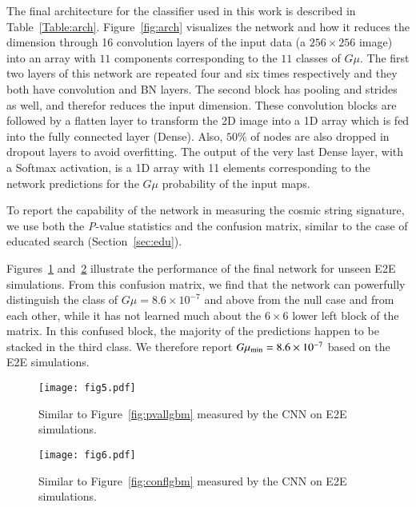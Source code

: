 \documentclass[fleqn,usenatbib]{mnras}
\newcommand{\bt}[1]{{\textcolor{Plum}{#1}}}
\begin{document}
%
The final architecture for the classifier used in this work is described in Table~\ref{Table:arch}. 
Figure~\ref{fig:arch} visualizes the network and how it reduces the dimension through 16 convolution layers of the input data (a $256\times 256$ image) into an array with $11$ components corresponding to the $11$ classes of $G\mu$.
The first two layers of this network are repeated four and six times respectively and they both have convolution and BN layers. The second block has  pooling and strides as well, and therefor reduces the input dimension. These convolution blocks are followed by a flatten layer to transform the 2D image into a 1D array which is fed into the fully connected layer (Dense). Also, $50\%$ of nodes are also dropped in dropout layers to avoid overfitting. The output of the very last Dense layer, with a Softmax activation, is a 1D array with 11 elements corresponding to the network predictions for the $G\mu$ probability of the input maps.


To report the capability of the network in measuring the cosmic string signature, we use both the {\it P}-value statistics and the confusion matrix, similar to the case of educated search (Section~\ref{sec:edu}).
\iffalse 
\bt{-- Note: Not sure if it is the right place to say this, but anyway:) -- As mentioned before for both educated and deep search we use patch-based analysis. Since the patches don't overlap they can be assumed as independent events, ie. knowing the probability of a patch belonging to each G$\mu$ class doesn't change the probability of the other patch. In order to use the full sky information, by assuming that the neighbour patches of a CMB sky which refer to a unique G$\mu$ are independent events, we can multiply the probability vectors of the patches together. After a normalization step, this yields to another probability vector which can be considered as the prediction of machine for G$\mu$ of the sky.}\fi
Figures~\ref{fig:cnnpval} and~\ref{fig:cnnconf} illustrate the performance of the final network  for unseen E2E simulations. From this confusion matrix, we find that the network can powerfully distinguish the class of $G\mu=8.6\times 10^{-7}$ and above from the null case and from each other, while it has not learned much about the $6\times6$ lower left block of the matrix. In this confused block, the majority of the predictions happen to be stacked in the third class. We therefore report $G\mu_{\rm min}=8.6\times10^{-7}$ based on the E2E simulations. 
\begin{figure}
	\texttt{[image: fig5.pdf]}
	\caption{Similar to Figure~\ref{fig:pvallgbm} measured by the CNN on E2E simulations.}
	\label{fig:cnnpval}
\end{figure}
\begin{figure}
	\centering
	\texttt{[image: fig6.pdf]}
	\caption{Similar to Figure~\ref{fig:conflgbm} measured by the CNN on E2E simulations.}
	\label{fig:cnnconf}
\end{figure} 
\end{document}
